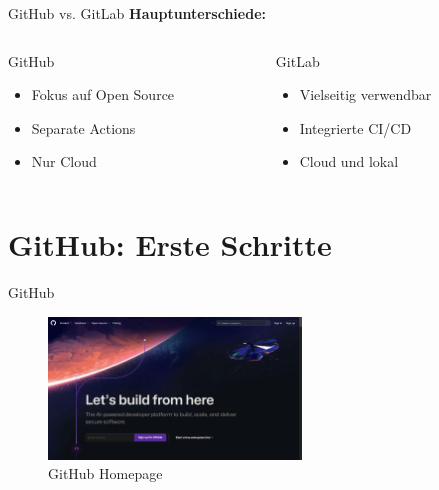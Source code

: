 \documentclass[compress,aspectratio=169]{beamer}
\begin{document}
	\begin{frame}{GitHub vs. GitLab}
		\textbf{Hauptunterschiede:}
		\vspace{1em}
		\begin{columns}
			\begin{column}{0.5\textwidth}
				GitHub
				\begin{itemize}
						\item Fokus auf Open Source
						\item Separate Actions
						\item Nur Cloud
				\end{itemize}
			\end{column}
			\begin{column}{0.5\textwidth}
				GitLab
				\begin{itemize}
						\item Vielseitig verwendbar
						\item Integrierte CI/CD
						\item Cloud und lokal
				\end{itemize}
			\end{column}
		\end{columns}
	\end{frame}
		

	\section{GitHub: Erste Schritte}
	
	\begin{frame}{GitHub}
		\begin{figure}
			\includegraphics[width=0.6\textwidth]{assets/github/github-home.jpg}
			\caption{GitHub Homepage}
		\end{figure}
	\end{frame}
\end{document}
